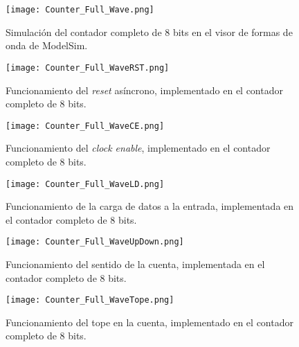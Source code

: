 \begin{figure}[ht]
	\centering
	\texttt{[image: Counter\_Full\_Wave.png]}
	\caption{Simulación del contador completo de 8 bits en el visor de formas de onda de ModelSim. \label{fig:counter_full_wave}}
\end{figure}

\begin{figure}[ht]
	\centering
	\texttt{[image: Counter\_Full\_WaveRST.png]}
	\caption {Funcionamiento del \textit{reset} asíncrono, implementado en el contador completo de 8 bits. \label{fig:counter_full_waverst}}
\end{figure}

\begin{figure}[ht]
	\centering
	\texttt{[image: Counter\_Full\_WaveCE.png]}
	\caption{Funcionamiento del \textit{clock enable}, implementado en el contador completo de 8 bits. \label{fig:counter_full_wavece}}
\end{figure}

\begin{figure}[ht]
	\centering
	\texttt{[image: Counter\_Full\_WaveLD.png]}
	\caption{Funcionamiento de la carga de datos a la entrada, implementada en el contador completo de 8 bits. \label{fig:counter_full_waveld}}
\end{figure}

\begin{figure}[ht]
	\centering
	\texttt{[image: Counter\_Full\_WaveUpDown.png]}
	\caption{Funcionamiento del sentido de la cuenta, implementada en el contador completo de 8 bits. \label{fig:counter_full_waveupdown}}
\end{figure}

\begin{figure}[ht]
	\centering
	\texttt{[image: Counter\_Full\_WaveTope.png]}
	\caption{Funcionamiento del tope en la cuenta, implementado en el contador completo de 8 bits. \label{fig:counter_full_wavetope}}
\end{figure}